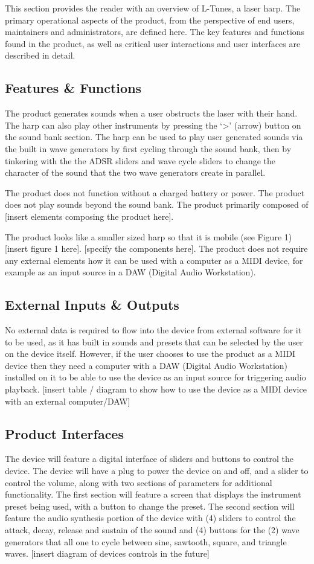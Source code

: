 This section provides the reader with an overview of L-Tunes, a laser harp. The primary operational aspects of the product, from the perspective of end users, maintainers and administrators, are defined here. The key features and functions found in the product, as well as critical user interactions and user interfaces are described in detail.

\subsection{Features \& Functions}
The product generates sounds when a user obstructs the laser with their hand. The harp can also play other instruments by pressing the ‘>’ (arrow) button on the sound bank section. The harp can be used to play user generated sounds via the built in wave generators by first cycling through the sound bank, then by tinkering with the the ADSR sliders and wave cycle sliders to change the character of the sound that the two wave generators create in parallel.

The product does not function without a charged battery or power. The product does not play sounds beyond the sound bank.
The product primarily composed of [insert elements composing the product here].

The product looks like a smaller sized harp so that it is mobile (see Figure 1) [insert figure 1 here]. [specify the components here]. The product does not require any external elements how it can be used with a computer as a MIDI device, for example as an input source in a DAW (Digital Audio Workstation). 

\subsection{External Inputs \& Outputs}
No external data is required to flow into the device from external software for it to be used, as it has built in sounds and presets that can be selected by the user on the device itself. However, if the user chooses to use the product as a MIDI device then they need a computer with a DAW (Digital Audio Workstation) installed on it to be able to use the device as an input source for triggering audio playback. 
[insert table / diagram to show how to use the device as a MIDI device with an external computer/DAW] 

\subsection{Product Interfaces}
The device will feature a digital interface of sliders and buttons to control the device. The device will have a plug to power the device on and off, and a slider to control the volume, along with two sections of parameters for additional functionality. The first section will feature a screen that displays the instrument preset being used, with a button to change the preset. The second section will feature the audio synthesis portion of the device with (4) sliders to control the attack, decay, release and sustain of the sound and (4) buttons for the (2) wave generators that all one to cycle between sine, sawtooth, square, and triangle waves. 
[insert diagram of devices controls in the future] 
